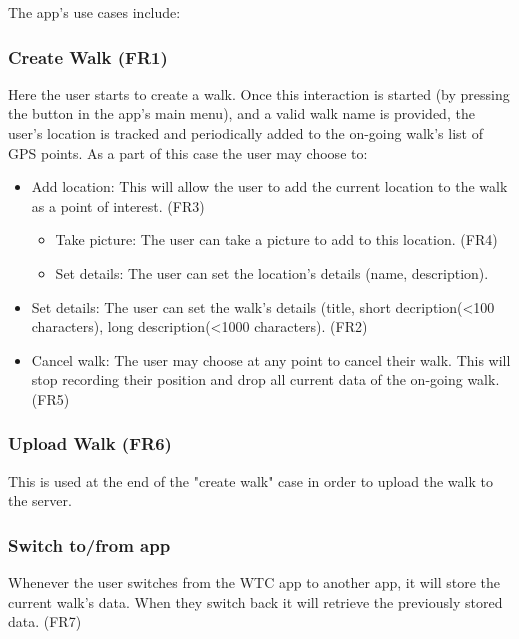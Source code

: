 \documentclass{project}
\begin{document}
\newpage

The app's use cases include: 

\subsubsection{Create Walk (FR1)}
Here the user starts to create a walk. Once this interaction is started 
(by pressing the button in the app's main menu), and a valid walk name is provided, 
the user's location is tracked and periodically added to the on-going walk's list of GPS points.\newline
As a part of this case the user may choose to: 

\begin{itemize}
\item Add location: This will allow the user to add the current location to the walk as a point of interest. (FR3)
		\begin{itemize}
		\item Take picture: The user can take a picture to add to this location. (FR4)
		\item Set details: The user can set the location's details (name, description).
		\end{itemize}
\item Set details: The user can set the walk's details (title, short decription(<100 characters), long description(<1000 characters). (FR2)
\item Cancel walk: The user may choose at any point to cancel their walk. This will stop recording their position and drop all current data of the on-going walk. (FR5)
\end{itemize}

\subsubsection{Upload Walk (FR6)}
This is used at the end of the "create walk" case in order to upload the walk to the server.

\subsubsection{Switch to/from app}
Whenever the user switches from the WTC app to another app, it will store the current walk's data. When they switch back it will retrieve the previously stored data. (FR7)
\end{document}
